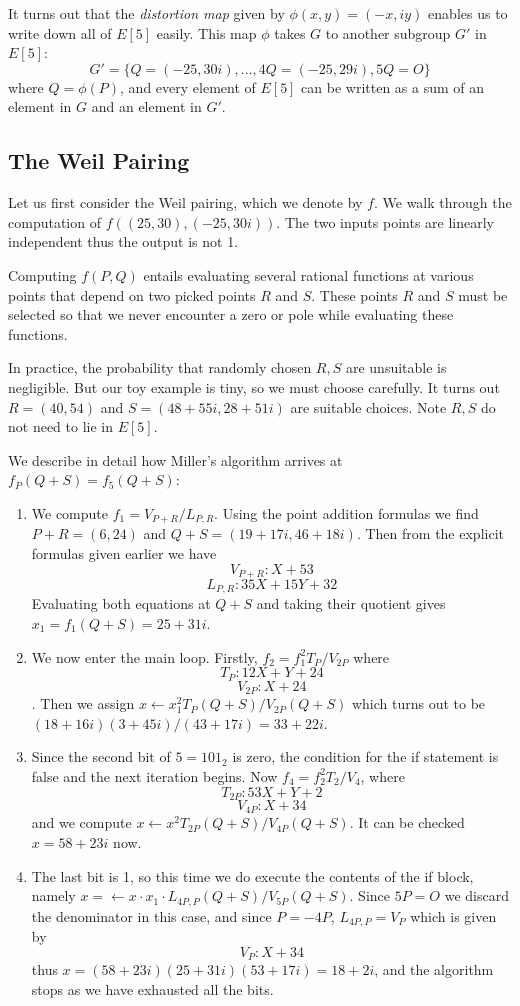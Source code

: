 It turns out that the \emph{distortion map} given by
$\phi(x,y) = (-x, i y)$ enables us to write down all of $E[5]$ easily.
This map $\phi$ takes $G$ to another subgroup $G'$ in $E[5]$:
\[ G' =
\{Q = (-25, 30i), ..., 4Q = (-25, 29i), 5Q = O \} \]
where $Q = \phi(P)$,
and every element of $E[5]$ can be written as a sum of an element in $G$
and an element in $G'$.

\subsection {The Weil Pairing}

Let us first consider the Weil pairing, which we denote by $f$.
We walk through the computation of $f((25,30), (-25,30i))$.
The two inputs points are linearly independent thus the output is not 1.

Computing $f(P, Q)$ entails evaluating several rational functions
at various points that depend on two picked points $R$ and $S$.
These points $R$ and $S$ must be selected so that we never encounter a
zero or pole while evaluating these functions.

In practice, the probability that randomly chosen $R, S$ are unsuitable
is negligible. But our toy example is tiny, so we must choose carefully.
It turns out $R = (40,54)$ and $S = (48+55i,28+51i)$ are suitable choices.
Note $R, S$ do not need to lie in $E[5]$.

We describe in detail how Miller's algorithm arrives at $f_P(Q+S) = f_5(Q+S)$:
\begin{enumerate}
\item
We compute $f_1 = V_{P+R} / L_{P,R}$.
Using the point addition formulas we find $P+R = (6,24)$
and $Q+S=(19+17i, 46+18i)$.
Then
from the explicit formulas given earlier we have
\[ V_{P+R} : X + 53 \]
\[ L_{P,R} : 35 X + 15 Y + 32 \]
Evaluating both equations at $Q + S$ and taking their quotient
gives $x_1 = f_1(Q+S) = 25 + 31i$.
\item
We now enter the main loop.
Firstly, $f_2 = f_1^2 T_{P} / V_{2P}$ where
\[ T_{P} : 12 X + Y + 24 \]
\[ V_{2P} : X + 24 \].
Then we assign $x \gets x_1^2 T_{P}(Q+S) / V_{2P}(Q+S)$
which turns out to be $(18 + 16i)(3+45i)/(43+17i) = 33 + 22i$.
\item
Since the second bit of $5 = 101_2$ is zero, the condition for the if statement
is false and the next iteration begins. Now
$f_4 = f_2^2 T_2 / V_4$, where
\[ T_{2P} : 53 X + Y + 2 \]
\[ V_{4P} : X + 34 \]
and we compute $x \gets x^2 T_{2P}(Q+S) / V_{4P}(Q+S)$.
It can be checked $x = 58 + 23i$ now.
\item
The last bit is 1, so this time we do execute the contents of the if block,
namely $x=\gets x \cdot x_1 \cdot L_{4P,P}(Q+S)/V_{5P}(Q+S)$.
Since $5P = O$ we discard the denominator in this case, and since $P = -4P$,
$L_{4P, P} = V_P$ which is given by
\[ V_P : X + 34 \] thus $x = (58+23i)(25+31i)(53+17i) = 18 + 2i$,
and the algorithm stops as we have exhausted all the bits.
\end{enumerate}

